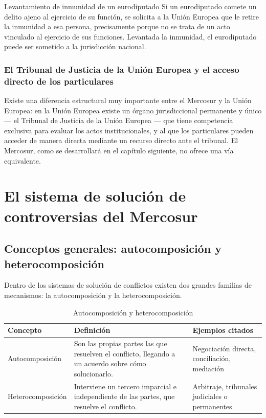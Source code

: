 \documentclass[12pt,oneside]{book}
\begin{document}
\begin{example}{Levantamiento de inmunidad de un eurodiputado}
Si un eurodiputado comete un delito ajeno al ejercicio de su función, se solicita a la Unión Europea que le retire la inmunidad a esa persona, precisamente porque no se trata de un acto vinculado al ejercicio de sus funciones. Levantada la inmunidad, el eurodiputado puede ser sometido a la jurisdicción nacional.
\end{example}

\subsection{El Tribunal de Justicia de la Unión Europea y el acceso directo de los particulares}

Existe una diferencia estructural muy importante entre el Mercosur y la Unión Europea: en la Unión Europea existe un órgano jurisdiccional permanente y único --- el Tribunal de Justicia de la Unión Europea --- que tiene competencia exclusiva para evaluar los actos institucionales, y al que los particulares pueden acceder de manera directa mediante un recurso directo ante el tribunal. El Mercosur, como se desarrollará en el capítulo siguiente, no ofrece una vía equivalente.

\chapter{El sistema de solución de controversias del Mercosur}

\section{Conceptos generales: autocomposición y heterocomposición}

Dentro de los sistemas de solución de conflictos existen dos grandes familias de mecanismos: la autocomposición y la heterocomposición.

\begin{table}[H]
\centering
\caption{Autocomposición y heterocomposición}
\begin{tabularx}{\textwidth}{@{}l X X@{}}
\toprule
\textbf{Concepto} & \textbf{Definición} & \textbf{Ejemplos citados} \\
\midrule
Autocomposición & Son las propias partes las que resuelven el conflicto, llegando a un acuerdo sobre cómo solucionarlo. & Negociación directa, conciliación, mediación \\
\addlinespace
Heterocomposición & Interviene un tercero imparcial e independiente de las partes, que resuelve el conflicto. & Arbitraje, tribunales judiciales o permanentes \\
\bottomrule
\end{tabularx}
\end{table}
\end{document}
